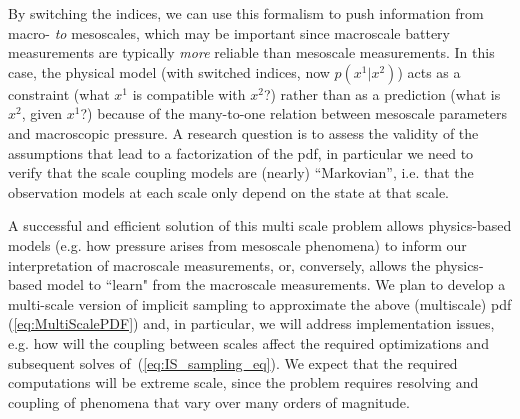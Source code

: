 \documentclass[11pt]{article}
\begin{document}
By switching the indices, we can use this formalism to push information from macro- \emph{to} mesoscales, which may be important since macroscale battery measurements are typically \emph{more} reliable than mesoscale measurements. In this case, the physical model (with switched indices, now $p(x^1|x^2)$) acts as a constraint
(what $x^1$ is compatible with $x^2$?) rather than as a prediction (what is $x^2$, given $x^1$?) because
of the many-to-one relation between mesoscale parameters and macroscopic pressure.
A research question is to assess the validity of the assumptions that lead to a factorization of the pdf,
in particular we need to verify that the scale coupling models are (nearly) ``Markovian'', i.e.
that the observation models at each scale only depend on the state at that scale. 

A successful and efficient solution of this multi scale problem allows physics-based models (e.g. how pressure arises from mesoscale phenomena) to inform our interpretation of macroscale measurements, or, conversely, allows the physics-based model to ``learn" from the macroscale measurements.
We plan to develop a multi-scale version of implicit sampling to approximate the above (multiscale) pdf (\ref{eq:MultiScalePDF}) and, in particular, we will address implementation issues, e.g. how will the coupling between scales affect the required optimizations and subsequent solves of~(\ref{eq:IS_sampling_eq}).
We expect that the required computations will be extreme scale, since the problem requires resolving and coupling of phenomena that vary over many orders of magnitude.
\end{document}
